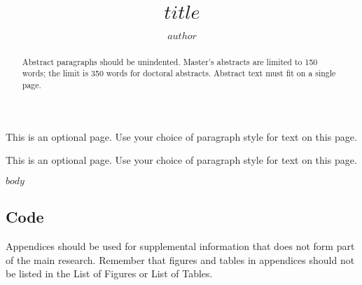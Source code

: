 \documentclass{sfuthesis}
\title{$title$}
\author{$author$}
\begin{document}
\frontmatter
\maketitle{}
\makecommittee{}


\begin{abstract}
Abstract paragraphs should be unindented. Master's abstracts are limited to 150 words; the limit is 350 words for doctoral abstracts. Abstract text must fit on a single page.
\end{abstract}


\begin{dedication}
This is an optional page. Use your choice of paragraph style for text on this page. \end{dedication}


\begin{acknowledgements}
This is an optional page. Use your choice of paragraph style for text on this page. \end{acknowledgements}

%
\tableofcontents%
\clearpage

%
\listoftables
\clearpage

%
\listoffigures
\clearpage





%
%

\mainmatter%

$body$



%
%
%
%
%

\backmatter%
	
	

\begin{appendices} %
\chapter{Code}

Appendices should be used for supplemental information that does not form part of the main research. Remember that figures and tables in appendices should not be listed in the List of Figures or List of Tables.

\end{appendices}
\end{document}
